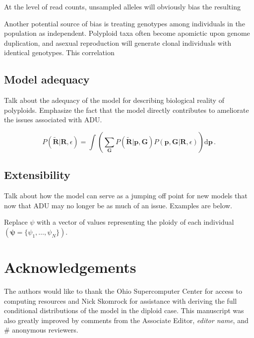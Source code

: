 \documentclass[11pt,english,letterpaper,oneside]{article}
\begin{document}
At the level of read counts, unsampled alleles will obviously bias the resulting
\medskip

Another potential source of bias is treating genotypes among individuals in the population as independent. Polyploid taxa often become apomictic upon genome duplication, and asexual reproduction will generate clonal individuals with identical genotypes. This correlation 

\medskip
\subsection*{Model adequacy}
\medskip

Talk about the adequacy of the model for describing biological reality of polyploids. Emphasize the fact that the model directly contributes to ameliorate the issues associated with ADU.

\begin{equation}
P(\tilde{\bm{R}}|\bm{R},\epsilon) = \int \left(\displaystyle\sum_{\bm{G}} P(\tilde{\bm{R}}|\bm{p},\bm{G}) P(\bm{p},\bm{G}|\bm{R},\epsilon)\right) \text{d}\bm{p}\, .
\end{equation}

\medskip
\subsection*{Extensibility}
\medskip

Talk about how the model can serve as a jumping off point for new models that now that ADU may no longer be as much of an issue. Examples are below.
\medskip

Replace $\psi$ with a vector of values representing the ploidy of each individual $(\bm{\psi} = \{\psi_1,\ldots,\psi_N\})$.
\medskip



\section*{Acknowledgements}           %

The authors would like to thank the Ohio Supercomputer Center for access to computing resources and Nick Skomrock for assistance with deriving the full conditional distributions of the model in the diploid case. This manuscript was also greatly improved by comments from the Associate Editor, \textit{editor name}, and \# anonymous reviewers.
\medskip

\end{document}
